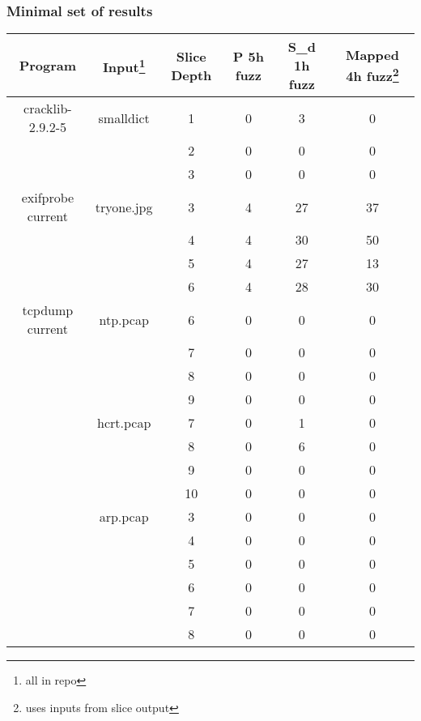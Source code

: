 \documentclass{beamer}
\begin{document}
\frame
{
	\frametitle{Minimal set of results}
	\tiny

	
	\begin{center}
	\begin{tabular}{| c | c | c  | c | c | c |}
	\hline
	Program            & Input\footnote{all in repo}        & Slice Depth  & P 5h fuzz & S\_d 1h fuzz & Mapped 4h fuzz\footnote{uses inputs from slice output} \\ \hline
	cracklib-2.9.2-5 & smalldict   &  1                 & 0             & 3                    & 0  \\
	                 	&                  &  2 		  & 0 		   & 0 			& 0  \\
	                 	&             	   & 	3 		 & 0 		   & 0 			& 0  \\ \hline
	exifprobe current & tryone.jpg & 3 		 & 4 		   & 27 			& 37  \\ 
	                  &            & 4 & 4 & 30 & 50  \\ 
	                  &            & 5 & 4 & 27 & 13  \\ 
	                  &            & 6 & 4 & 28 & 30  \\ \hline
	tcpdump current   & ntp.pcap   & 6 & 0 & 0 & 0   \\ 
	                  &   & 7 & 0 & 0 & 0   \\ 
	                  &    & 8 & 0 & 0 & 0   \\ 
	                  &    & 9 & 0 & 0 & 0   \\ \cline{2-6}
                      & hcrt.pcap  & 7 & 0 & 1 & 0   \\
                      &            & 8 & 0 & 6 & 0   \\ 
                      &            & 9 & 0 & 0 & 0   \\
                      &            & 10 & 0 & 0 & 0  \\ \cline{2-6}
                      & arp.pcap   & 3 & 0 & 0 & 0  \\ 
                      &    & 4 & 0 & 0 & 0  \\                    
                      &    & 5 & 0 & 0 & 0  \\ 
                      &    & 6 & 0 & 0 & 0  \\
                      &    & 7 & 0 & 0 & 0  \\
                      &    & 8 & 0 & 0 & 0  \\ \hline                                                                 
	\end{tabular}
	\end{center}


}
\end{document}
